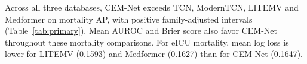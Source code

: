 Across all three databases, CEM-Net exceeds TCN, ModernTCN, LITEMV and Medformer on mortality AP, with positive family-adjusted intervals (Table~\ref{tab:primary}). Mean AUROC and Brier score also favor CEM-Net throughout these mortality comparisons. For eICU mortality, mean log loss is lower for LITEMV (0.1593) and Medformer (0.1627) than for CEM-Net (0.1647).
